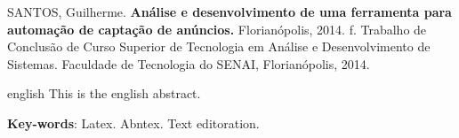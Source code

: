 \noindent
SANTOS, Guilherme. \textbf{Análise e desenvolvimento de uma ferramenta para automação de captação de anúncios.}
Florianópolis, 2014. \pageref{nropaginas}f. Trabalho de Conclusão de Curso Superior de Tecnologia em
Análise e Desenvolvimento de Sistemas. Faculdade de Tecnologia do SENAI, Florianópolis, 2014.

\vspace{1cm}
\begin{resumo}
 \begin{otherlanguage*}{english}
   This is the english abstract.

   \vspace{\onelineskip}
 
   \noindent 
   \textbf{Key-words}: Latex. Abntex. Text editoration.
 \end{otherlanguage*}
\end{resumo}


